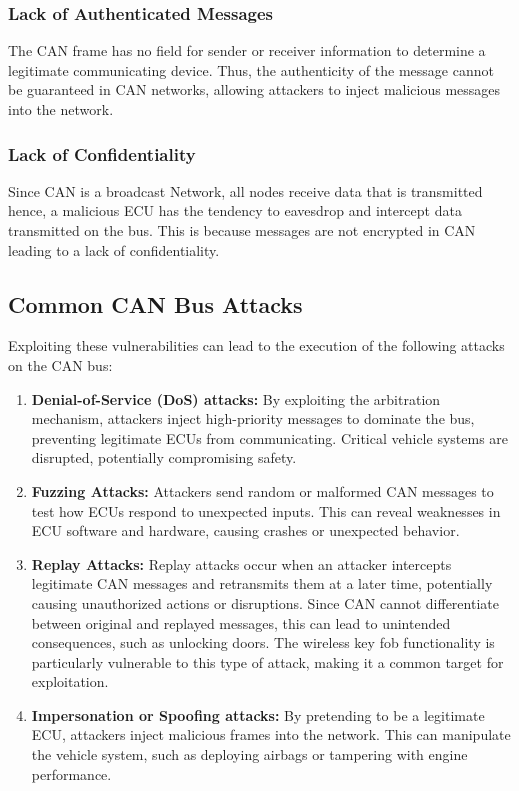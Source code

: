 \documentclass{report}
\begin{document}
\subsubsection{Lack of Authenticated Messages}
The CAN frame has no field for sender or receiver information to determine a legitimate communicating device. Thus, the authenticity of the message cannot be guaranteed in CAN networks, allowing attackers to inject malicious messages into the network.

\subsubsection{Lack of Confidentiality}
Since CAN is a broadcast Network, all nodes receive data that is transmitted hence, a malicious ECU has the tendency to eavesdrop and intercept data transmitted on the bus. This is because messages are not encrypted in CAN leading to a lack of confidentiality.

\subsection{Common CAN Bus Attacks}
Exploiting these vulnerabilities can lead to the execution of the following attacks on the CAN bus:

\begin{enumerate}
    \item \textbf{Denial-of-Service (DoS) attacks:} By exploiting the arbitration mechanism, attackers inject high-priority messages to dominate the bus, preventing legitimate ECUs from communicating. Critical vehicle systems are disrupted, potentially compromising safety.
    \item \textbf{Fuzzing Attacks:} Attackers send random or malformed CAN messages to test how ECUs respond to unexpected inputs. This can reveal weaknesses in ECU software and hardware, causing crashes or unexpected behavior.
    \item \textbf{Replay Attacks:} Replay attacks occur when an attacker intercepts legitimate CAN messages and retransmits them at a later time, potentially causing unauthorized actions or disruptions. Since CAN cannot differentiate between original and replayed messages, this can lead to unintended consequences, such as unlocking doors. The wireless key fob functionality is particularly vulnerable to this type of attack, making it a common target for exploitation.
    \item \textbf{Impersonation or Spoofing attacks:} By pretending to be a legitimate ECU, attackers inject malicious frames into the network. This can manipulate the vehicle system, such as deploying airbags or tampering with engine performance.
\end{enumerate}
\end{document}
